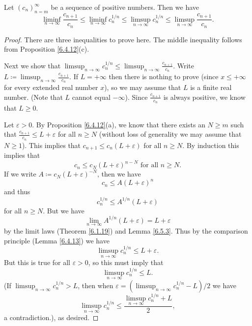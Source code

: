 \begin{lemma}\label{7.5.2}
    Let \((c_n)_{n = m}^\infty\) be a sequence of positive numbers.
    Then we have
    \[
        \liminf_{n \to \infty} \frac{c_{n + 1}}{c_n} \leq \liminf_{n \to \infty} c_n^{1 / n} \leq \limsup_{n \to \infty} c_n^{1 / n} \leq \limsup_{n \to \infty} \frac{c_{n + 1}}{c_n}.
    \]
\end{lemma}

\begin{proof}
    There are three inequalities to prove here.
    The middle inequality follows from Proposition \ref{6.4.12}(c).

    Next we show that \(\limsup_{n \to \infty} c_n^{1 / n} \leq \limsup_{n \to \infty} \frac{c_{n + 1}}{c_n}\).
    Write \(L \coloneqq \limsup_{n \to \infty} \frac{c_{n + 1}}{c_n}\).
    If \(L = +\infty\) then there is nothing to prove (since \(x \leq +\infty\) for every extended real number \(x\)), so we may assume that \(L\) is a finite real number.
    (Note that \(L\) cannot equal \(-\infty\)).
    Since \(\frac{c_{n + 1}}{c_n}\) is always positive, we know that \(L \geq 0\).

    Let \(\varepsilon > 0\).
    By Proposition \ref{6.4.12}(a), we know that there exists an \(N \geq m\) such that \(\frac{c_{n + 1}}{c_n} \leq L + \varepsilon\) for all \(n \geq N\)
    (without loss of generality we may assume that \(N \geq 1\)).
    This implies that \(c_{n + 1} \leq c_n (L + \varepsilon)\) for all \(n \geq N\).
    By induction this implies that
    \[
        c_n \leq c_N (L + \varepsilon)^{n - N} \text{ for all } n \geq N.
    \]
    If we write \(A \coloneqq c_N (L + \varepsilon)^{-N}\), then we have
    \[
        c_n \leq A(L + \varepsilon)^n
    \]
    and thus
    \[
        c_n^{1 / n} \leq A^{1 / n} (L + \varepsilon)
    \]
    for all \(n \geq N\).
    But we have
    \[
        \lim_{n \to \infty} A^{1 / n} (L + \varepsilon) = L + \varepsilon
    \]
    by the limit laws (Theorem \ref{6.1.19}) and Lemma \ref{6.5.3}.
    Thus by the comparison principle (Lemma \ref{6.4.13}) we have
    \[
        \limsup_{n \to \infty} c_n^{1 / n} \leq L + \varepsilon.
    \]
    But this is true for all \(\varepsilon > 0\), so this must imply that
    \[
        \limsup_{n \to \infty} c_n^{1 / n} \leq L.
    \]
    (If \(\limsup_{n \to \infty} c_n^{1 / n} > L\), then when \(\varepsilon = (\limsup_{n \to \infty} c_n^{1 / n} - L) / 2\) we have
    \[
        \limsup_{n \to \infty} c_n^{1 / n} \leq \frac{\limsup_{n \to \infty} c_n^{1 / n} + L}{2},
    \]
    a contradiction.), as desired.


\end{proof}
